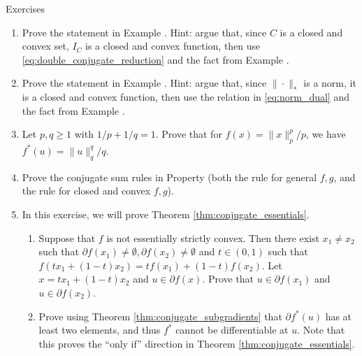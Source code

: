 \begin{xcb}{Exercises}
\begin{enumerate}[label=\thechapter.\arabic*]
\item \label{ex:support_function_conjugate}
  Prove the statement in Example . Hint:
  argue that, since $C$ is a closed and convex set, $I_C$ is a closed and convex
  function, then use \eqref{eq:double_conjugate_reduction} and the fact from 
  Example . 

\item \label{ex:norm_conjugate}
  Prove the statement in Example . Hint: argue that,
  since $\|\cdot\|_*$ is a norm, it is a closed and convex function, then use
  the relation in \eqref{eq:norm_dual} and the fact from Example 
  .  
 
\item Let $p,q \geq 1$ with $1/p + 1/q = 1$. Prove that for $f(x) =
  \|x\|_p^p/p$, we have $f^*(u) = \|u\|_q^q/q$.   

\item Prove the conjugate sum rules in Property
   (both the rule for general $f,g$, and the
  rule for closed and convex $f,g$).  

\item \label{ex:conjugate_essentials} 
  In this exercise, we will prove Theorem \ref{thm:conjugate_essentials}.

\begin{enumerate}[label=\alph*.]
\item Suppose that $f$ is not essentially strictly convex. Then there exist
  $x_1 \not= x_2$ such that $\partial f(x_1) \not= \emptyset, \partial f(x_2)
  \not= \emptyset$ and $t \in (0,1)$ such that $f(tx_1 + (1-t)x_2) = tf(x_1) +
  (1-t)f(x_2)$. Let $x = tx_1 + (1-t)x_2$ and $u \in \partial f(x)$. Prove that
  $u \in \partial f(x_1)$ and $u \in \partial f(x_2)$.  

\item Prove using Theorem \ref{thm:conjugate_subgradients} that $\partial
  f^*(u)$ has at least two elements, and thus $f^*$ cannot be differentiable at
  $u$. Note that this proves the ``only if'' direction in Theorem
  \ref{thm:conjugate_essentials}.  


\end{enumerate}
\end{enumerate}
\end{xcb}
